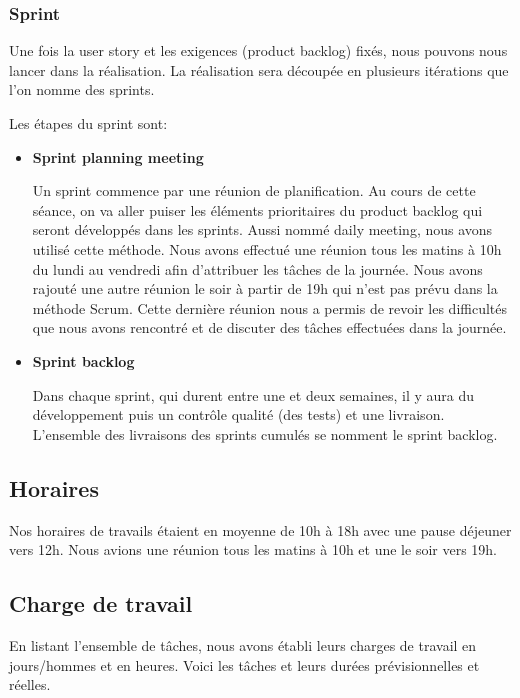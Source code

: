\subsubsection{Sprint}
Une fois la user story et les exigences (product backlog) fixés, nous pouvons nous lancer dans la réalisation.
La réalisation sera découpée en plusieurs itérations que l'on nomme des sprints. 

Les étapes du sprint sont:
\begin{itemize}
    \item \textbf{Sprint planning meeting}

    Un sprint commence par une réunion de planification.
    Au cours de cette séance, on va aller puiser les éléments prioritaires du product backlog qui seront développés dans les sprints.
    Aussi nommé daily meeting, nous avons utilisé cette méthode.
    Nous avons effectué une réunion tous les matins à 10h du lundi au vendredi afin d'attribuer les tâches de la journée.
    Nous avons rajouté une autre réunion le soir à partir de 19h qui n’est pas prévu dans la méthode Scrum.
    Cette dernière réunion nous a permis de revoir les difficultés que nous avons rencontré et de discuter des tâches effectuées dans la journée. 

    \item \textbf{Sprint backlog}

    Dans chaque sprint, qui durent entre une et deux semaines, il y aura du développement puis un contrôle qualité (des tests) et une livraison.
    L'ensemble des livraisons des sprints cumulés se nomment le sprint backlog.
\end{itemize}



\subsection{Horaires}
Nos horaires de travails étaient en moyenne de 10h à 18h avec une pause déjeuner vers 12h.
Nous avions une réunion tous les matins à 10h et une le soir vers 19h.



\subsection{Charge de travail}

En listant l'ensemble de tâches, nous avons établi leurs charges de travail en jours/hommes et en heures. 
Voici les tâches et leurs durées prévisionnelles et réelles.

